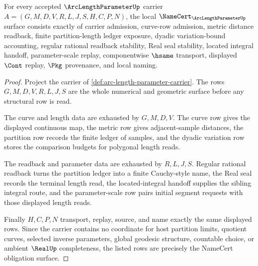 \begin{theorem}
\label{thm:arc-length-parameter-namecert-obligations}
For every accepted $\ArcLengthParameterUp$ carrier $A=(G,M,D,V,R,L,J,S,H,C,P,N)$, the local $\NameCert_{\ArcLengthParameterUp}$ surface consists exactly of carrier admission, curve-row admission, metric distance readback, finite partition-length ledger exposure, dyadic variation-bound accounting, regular rational readback stability, Real seal stability, located integral handoff, parameter-scale replay, componentwise $\hsame$ transport, displayed $\Cont$ replay, $\Pkg$ provenance, and local naming.
\end{theorem}
\begin{proof}
Project the carrier of \autoref{def:arc-length-parameter-carrier}. The rows $G,M,D,V,R,L,J,S$ are the whole numerical and geometric surface before any structural row is read.

The curve and length data are exhausted by $G,M,D,V$. The curve row gives the displayed continuous map, the metric row gives adjacent-sample distances, the partition row records the finite ledger of samples, and the dyadic variation row stores the comparison budgets for polygonal length reads.

The readback and parameter data are exhausted by $R,L,J,S$. Regular rational readback turns the partition ledger into a finite Cauchy-style name, the Real seal records the terminal length read, the located-integral handoff supplies the sibling integral route, and the parameter-scale row pairs initial segment requests with those displayed length reads.

Finally $H,C,P,N$ transport, replay, source, and name exactly the same displayed rows. Since the carrier contains no coordinate for host partition limits, quotient curves, selected inverse parameters, global geodesic structure, countable choice, or ambient $\RealUp$ completeness, the listed rows are precisely the NameCert obligation surface.
\end{proof}

